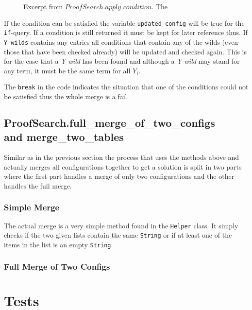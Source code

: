 \begin{figure}[H]
	\vspace{-10pt}
	
	\vspace{-10pt}
	\caption{Excerpt from $ProofSearch.apply\_condition$. The  }
	\vspace{-10pt}
\end{figure}


If the condition can be satisfied the variable \texttt{updated\_config} will be true for the \texttt{if}-query. If a condition is still returned it must be kept for later reference thus. If \texttt{Y-wilds} contains any entries all conditions that contain any of the wilds (even those that have been checked already) will be updated and checked again. This is for the case that a \emph{Y-wild} has been found and although a \emph{Y-wild} may stand for any term, it must be the same term for all $Y_i$. 

The \texttt{break} in the code indicates the situation that one of the conditions could not be satisfied thus the whole merge is a fail. 

\subsection[ProofSearch.merge]{ProofSearch.full\_merge\_of\_two\_configs \\and merge\_two\_tables}
Similar as in the previous section the process that uses the methods above and actually merges all configurations together to get a solution is split in two parts where the first part handles a merge of only two configurations and the other handles the full merge.

\subsubsection{Simple Merge}
The actual merge is a very simple method found in the \texttt{Helper} class. It simply checks if the two given lists contain the same \texttt{String} or if at least one of the items in the list is an empty \texttt{String}.

\subsubsection{Full Merge of Two Configs}


\section{Tests}
